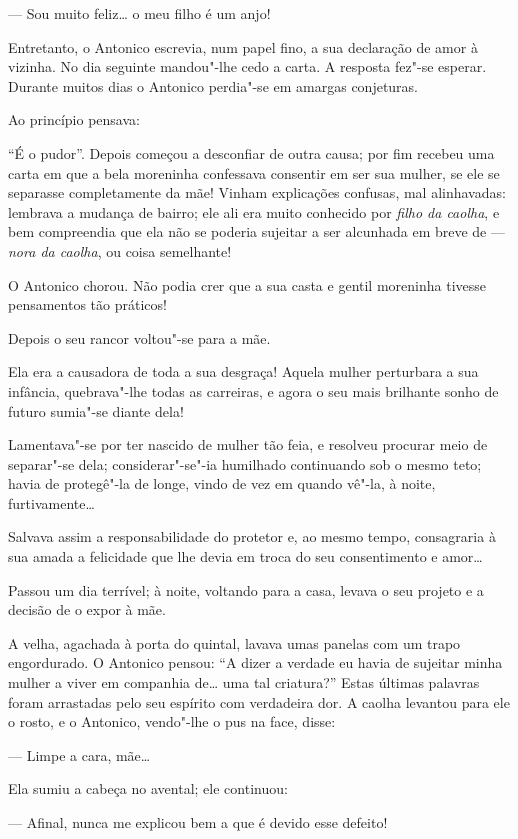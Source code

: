 --- Sou muito feliz\ldots{} o meu filho é um anjo!

Entretanto, o Antonico escrevia, num papel fino, a sua declaração de
amor à vizinha. No dia seguinte mandou"-lhe cedo a carta. A resposta
fez"-se esperar. Durante muitos dias o Antonico perdia"-se em amargas
conjeturas.

Ao princípio pensava:

``É o pudor''. Depois começou a desconfiar de outra causa; por fim
recebeu uma carta em que a bela moreninha confessava consentir em ser
sua mulher, se ele se separasse completamente da mãe! Vinham explicações
confusas, mal alinhavadas: lembrava a mudança de bairro; ele ali era
muito conhecido por \emph{filho da caolha}, e bem compreendia que ela
não se poderia sujeitar a ser alcunhada em breve de --- \emph{nora da
caolha}, ou coisa semelhante!

O Antonico chorou. Não podia crer que a sua casta e gentil moreninha
tivesse pensamentos tão práticos!

Depois o seu rancor voltou"-se para a mãe.

Ela era a causadora de toda a sua desgraça! Aquela mulher perturbara a
sua infância, quebrava"-lhe todas as carreiras, e agora o seu mais
brilhante sonho de futuro sumia"-se diante dela!

Lamentava"-se por ter nascido de mulher tão feia, e resolveu procurar
meio de separar"-se dela; considerar"-se"-ia humilhado continuando sob o
mesmo teto; havia de protegê"-la de longe, vindo de vez em quando vê"-la,
à noite, furtivamente\ldots{}

Salvava assim a responsabilidade do protetor e, ao mesmo tempo,
consagraria à sua amada a felicidade que lhe devia em troca do seu
consentimento e amor\ldots{}

Passou um dia terrível; à noite, voltando para a casa, levava o seu
projeto e a decisão de o expor à mãe.

A velha, agachada à porta do quintal, lavava umas panelas com um trapo
engordurado. O Antonico pensou: ``A dizer a verdade eu havia de sujeitar
minha mulher a viver em companhia de\ldots{} uma tal criatura?'' Estas
últimas palavras foram arrastadas pelo seu espírito com verdadeira dor.
A caolha levantou para ele o rosto, e o Antonico, vendo"-lhe o pus na
face, disse:

--- Limpe a cara, mãe\ldots{}

Ela sumiu a cabeça no avental; ele continuou:

--- Afinal, nunca me explicou bem a que é devido esse defeito!

